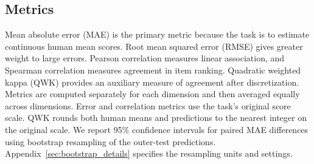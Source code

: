 \subsection{Metrics}

Mean absolute error (MAE) is the primary metric because the task is to estimate continuous human mean scores. Root mean squared error (RMSE) gives greater weight to large errors. Pearson correlation measures linear association, and Spearman correlation measures agreement in item ranking. Quadratic weighted kappa (QWK) provides an auxiliary measure of agreement after discretization. Metrics are computed separately for each dimension and then averaged equally across dimensions. Error and correlation metrics use the task's original score scale. QWK rounds both human means and predictions to the nearest integer on the original scale. We report 95\% confidence intervals for paired MAE differences using bootstrap resampling of the outer-test predictions. Appendix~\ref{sec:bootstrap_details} specifies the resampling units and settings.
